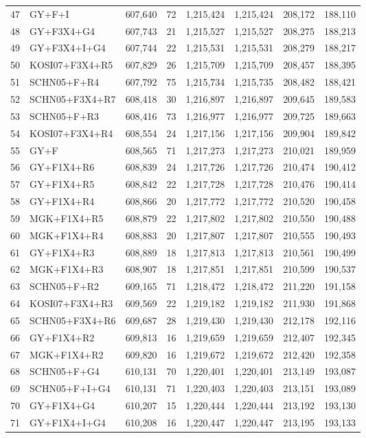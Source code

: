 \begin{table}
\begin{longtable}{rlrrrrrr}
47&GY+F+I&607,640&72&1,215,424&1,215,424&208,172&188,110\\
48&GY+F3X4+G4&607,743&21&1,215,527&1,215,527&208,275&188,213\\
49&GY+F3X4+I+G4&607,744&22&1,215,531&1,215,531&208,279&188,217\\
50&KOSI07+F3X4+R5&607,829&26&1,215,709&1,215,709&208,457&188,395\\
51&SCHN05+F+R4&607,792&75&1,215,734&1,215,735&208,482&188,421\\
52&SCHN05+F3X4+R7&608,418&30&1,216,897&1,216,897&209,645&189,583\\
53&SCHN05+F+R3&608,416&73&1,216,977&1,216,977&209,725&189,663\\
54&KOSI07+F3X4+R4&608,554&24&1,217,156&1,217,156&209,904&189,842\\
55&GY+F&608,565&71&1,217,273&1,217,273&210,021&189,959\\
56&GY+F1X4+R6&608,839&24&1,217,726&1,217,726&210,474&190,412\\
57&GY+F1X4+R5&608,842&22&1,217,728&1,217,728&210,476&190,414\\
58&GY+F1X4+R4&608,866&20&1,217,772&1,217,772&210,520&190,458\\
59&MGK+F1X4+R5&608,879&22&1,217,802&1,217,802&210,550&190,488\\
60&MGK+F1X4+R4&608,883&20&1,217,807&1,217,807&210,555&190,493\\
61&GY+F1X4+R3&608,889&18&1,217,813&1,217,813&210,561&190,499\\
62&MGK+F1X4+R3&608,907&18&1,217,851&1,217,851&210,599&190,537\\
63&SCHN05+F+R2&609,165&71&1,218,472&1,218,472&211,220&191,158\\
64&KOSI07+F3X4+R3&609,569&22&1,219,182&1,219,182&211,930&191,868\\
65&SCHN05+F3X4+R6&609,687&28&1,219,430&1,219,430&212,178&192,116\\
66&GY+F1X4+R2&609,813&16&1,219,659&1,219,659&212,407&192,345\\
67&MGK+F1X4+R2&609,820&16&1,219,672&1,219,672&212,420&192,358\\
68&SCHN05+F+G4&610,131&70&1,220,401&1,220,401&213,149&193,087\\
69&SCHN05+F+I+G4&610,131&71&1,220,403&1,220,403&213,151&193,089\\
70&GY+F1X4+G4&610,207&15&1,220,444&1,220,444&213,192&193,130\\
71&GY+F1X4+I+G4&610,208&16&1,220,447&1,220,447&213,195&193,133\\

\end{longtable}
\end{table}
